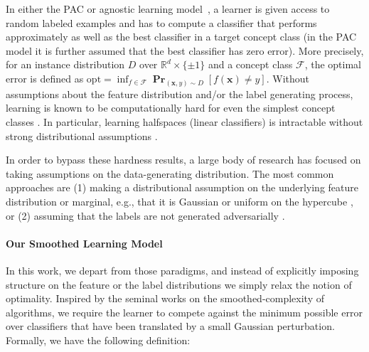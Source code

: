 \documentclass[10pt,a4paper]{article}
\renewcommand\vec[1]{\mathbf{#1}}
\DeclareMathOperator*{\pr}{\mathbf{Pr}}
\newcommand{\R}{\mathbb{R}}
\newcommand{\opt}{\mathrm{opt}}
\newcommand{\1}{\Ind}
\newcommand{\x}{\vec x}
\begin{document}
In either the PAC or agnostic learning model~\cite{val84,Haussler:92,KSS:94}, a learner is given access to random labeled examples and has to compute a classifier that performs approximately as well as the best classifier in a target concept class (in the PAC model it is further assumed that the best classifier has zero error).  More precisely, for an instance distribution $D$ over 
$\R^d \times \{ \pm 1\}$ and a concept class $\mathcal F$, the optimal error is 
defined as $\opt = \inf_{f \in \mathcal F} \pr_{(\x, y) \sim D}[f(\x) \neq y]$.
Without assumptions about the feature distribution and/or the label generating process, learning is known to be computationally hard for even the simplest concept classes \cite{Khar1993,  GR:06,DBLP:journals/toc/Dachman-SoledLMSWW09, DBLP:journals/jcss/KhotS11, DBLP:journals/siamcomp/FeldmanGRW12,klivans2009cryptographic,DOSW:11, FLS:11colt, DanielyV21}. In particular, learning halfspaces (linear classifiers) is intractable without strong distributional assumptions \cite{KKMS:05,GR:06, Feldman:06, Daniely16}.

In order to bypass these hardness results, a large body of research has focused on taking assumptions on the data-generating distribution. 
The most common approaches are (1) making a distributional assumption on the underlying feature distribution or marginal, e.g., that it is Gaussian or uniform on the hypercube \cite{LMN:93,Long:03, KKMS:05,KOS:08, GKK:08,kalai2009learning,ABL17,DKKTZ21}, or (2) assuming that the labels are not generated adversarially  
\cite{AwasthiBHU15,AwasthiBHZ16,DGT19,DKTZ20,CKMY20,ZSA20,DKKTZ22,daniely2023computational,daniely2023most}.


\paragraph{Our Smoothed Learning Model} 
In this work, we depart from those paradigms, and instead of explicitly imposing structure 
on the feature or the label distributions we simply relax the notion of optimality.  Inspired by the seminal works \cite{spielman2004smoothed,spielman2005smoothed} on the 
smoothed-complexity of algorithms,
we require the learner to compete against
the minimum possible error over classifiers that have been translated by a small Gaussian perturbation. 
 Formally, we have the following definition:
 
\end{document}
